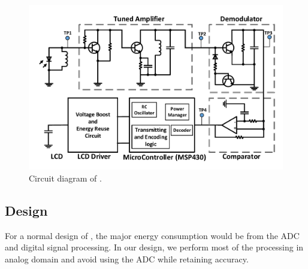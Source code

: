 \begin{figure}[!th]
\centering
\includegraphics[width=\columnwidth]{fig/tag_diagram.pdf}
\vspace{-1em}
\caption{Circuit diagram of \vitag.}
\label{fig:diagram_tag}
\end{figure}


\subsection{\tagrx Design}

For a normal design of \tagrx, the major energy consumption would be from the ADC and digital signal processing. 
In our design, we perform most of the processing in analog domain and avoid using the ADC while retaining accuracy. 



